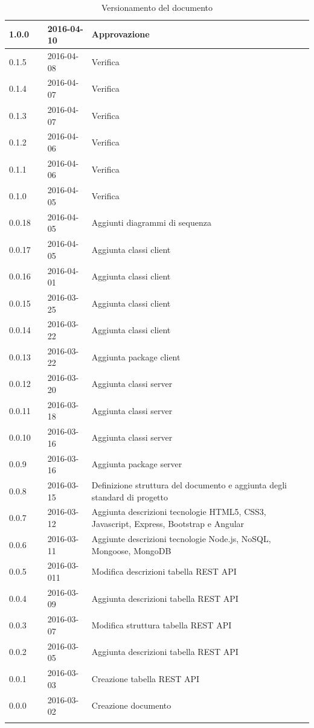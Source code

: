 \documentclass[12pt,a4paper]{article}
\begin{document}
\begin{center}
\begin{longtable}[H]{p{} p{} p{} p{}}
		\midrule
		1.0.0 & \TP{} & 2016-04-10 & Approvazione \\*
		\midrule
		0.1.5 & \NDC{} & 2016-04-08 & Verifica \\*
		\midrule
		0.1.4 & \WS{} & 2016-04-07 & Verifica \\*
		\midrule
		0.1.3 & \AVE{} & 2016-04-07 & Verifica \\*
		\midrule
		0.1.2 & \AVI{} & 2016-04-06 & Verifica \\*
		\midrule
		0.1.1 & \AB{} & 2016-04-06 & Verifica \\*
		\midrule
		0.1.0 & \IB{} & 2016-04-05 & Verifica \\*
		\midrule
		0.0.18 & \NDC{} & 2016-04-05 & Aggiunti diagrammi di sequenza \\*
		\midrule
		0.0.17 & \IB{} & 2016-04-05 & Aggiunta classi client \\*
		\midrule
		0.0.16 & \WS{} & 2016-04-01 & Aggiunta classi client \\*
		\midrule
		0.0.15 & \AB{} & 2016-03-25 & Aggiunta classi client \\*
		\midrule
		0.0.14 & \NDC{} & 2016-03-22 & Aggiunta classi client \\*
		\midrule
		0.0.13 & \NDC{} & 2016-03-22 & Aggiunta package client \\*
		\midrule
		0.0.12 & \AVE{} & 2016-03-20 & Aggiunta classi server \\*
		\midrule
		0.0.11 & \AVI{} & 2016-03-18 & Aggiunta classi server \\*
		\midrule
		0.0.10 & \TP{} & 2016-03-16 & Aggiunta classi server \\*
		\midrule
		0.0.9 & \TP{} & 2016-03-16 & Aggiunta package server \\*
        \midrule
        0.0.8 & \NDC{} & 2016-03-15 & Definizione struttura del documento e aggiunta
            degli standard di progetto \\*
		\midrule
		0.0.7 & \AVE{} & 2016-03-12 & Aggiunta descrizioni tecnologie HTML5, CSS3, Javascript, 
            Express, Bootstrap e Angular \\*
		\midrule
		0.0.6 & \AVE{} & 2016-03-11 & Aggiunte descrizioni tecnologie Node.js, NoSQL, Mongoose, MongoDB \\*
		\midrule
		0.0.5 & \AVE{} & 2016-03-011 & Modifica descrizioni tabella REST API \\*
		\midrule
		0.0.4 & \TP{} & 2016-03-09 &  Aggiunta descrizioni tabella REST API \\*
		\midrule
		0.0.3 & \TP{} & 2016-03-07 &  Modifica struttura tabella REST API \\*
		\midrule
		0.0.2 & \AVI{} & 2016-03-05 &  Aggiunta descrizioni tabella REST API \\*
		\midrule
		0.0.1 & \NDC{} & 2016-03-03 &  Creazione tabella REST API \\*
		\midrule
		0.0.0 & \NDC{} & 2016-03-02 &  Creazione documento \\*
		\bottomrule
		\caption{Versionamento del documento}
		\label{tabVers1} 
	\end{longtable}
\end{center}
\end{document}
